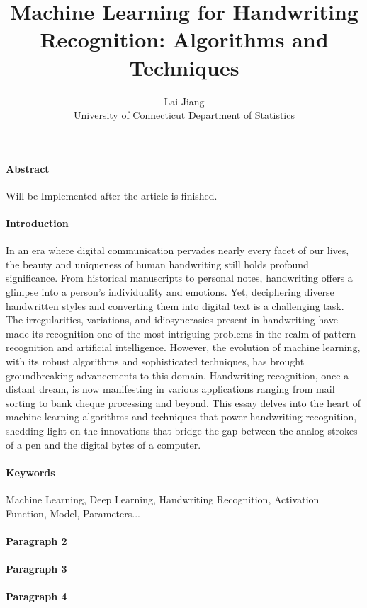\documentclass[12pt]{article}
\title{Machine Learning for Handwriting Recognition: Algorithms and Techniques}
\author{Lai Jiang\\
  University of Connecticut Department of Statistics
}
\begin{document}
\maketitle

\paragraph{Abstract}
Will be Implemented after the article is finished.

\paragraph{Introduction}
In an era where digital communication pervades nearly every facet of our lives, the beauty and uniqueness of human handwriting still holds profound significance. From historical manuscripts to personal notes, handwriting offers a glimpse into a person's individuality and emotions. Yet, deciphering diverse handwritten styles and converting them into digital text is a challenging task. The irregularities, variations, and idiosyncrasies present in handwriting have made its recognition one of the most intriguing problems in the realm of pattern recognition and artificial intelligence. However, the evolution of machine learning, with its robust algorithms and sophisticated techniques, has brought groundbreaking advancements to this domain. Handwriting recognition, once a distant dream, is now manifesting in various applications ranging from mail sorting to bank cheque processing and beyond. This essay delves into the heart of machine learning algorithms and techniques that power handwriting recognition, shedding light on the innovations that bridge the gap between the analog strokes of a pen and the digital bytes of a computer.

\paragraph{Keywords}
Machine Learning, Deep Learning, Handwriting Recognition, Activation Function, Model, Parameters...

\paragraph{Paragraph 2}


\paragraph{Paragraph 3}


\paragraph{Paragraph 4}




\cite{824821}
\cite{NIPS2008_66368270}
\cite{6981034}
\end{document}
